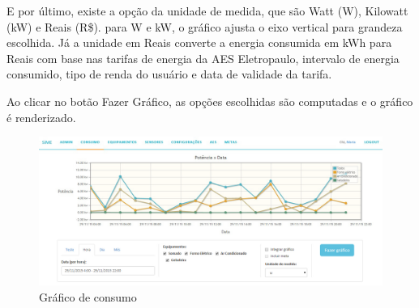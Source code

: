 E por último, existe a opção da unidade de medida, que são Watt (W), Kilowatt (kW) e Reais (R\$). para W e kW, o gráfico ajusta o eixo vertical para grandeza escolhida. Já a unidade em Reais converte a energia consumida em kWh para Reais com base nas tarifas de energia da AES Eletropaulo, intervalo de energia consumido, tipo de renda do usuário e data de validade da tarifa.

Ao clicar no botão Fazer Gráfico, as opções escolhidas são computadas e o gráfico é renderizado.

\begin{figure}[H]
\centering
\includegraphics[width=1\textwidth]{figuras/consumo.jpg}
\caption{\label{fig:telas-grafico} Gráfico de consumo}
\end{figure}